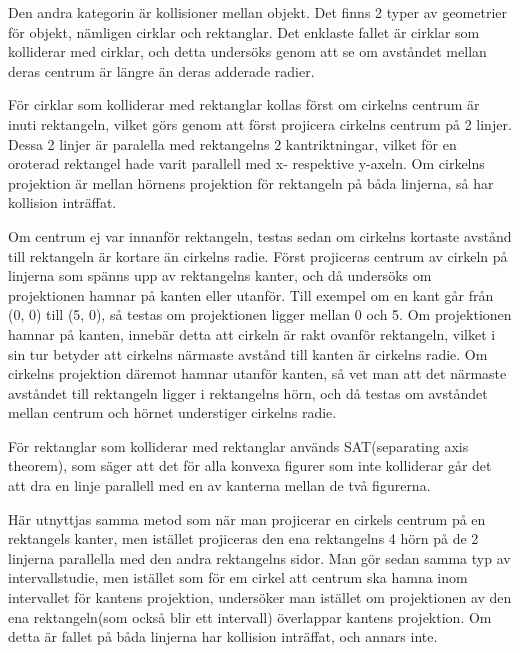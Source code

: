 \documentclass[12pt,a4paper]{article}
\begin{document}
Den andra kategorin är kollisioner mellan objekt. Det finns 2 typer av geometrier för objekt, nämligen cirklar och rektanglar. Det enklaste fallet är cirklar som kolliderar med cirklar, och detta undersöks genom att se om avståndet mellan deras centrum är längre än deras adderade radier.

\vspace{0.2cm}

För cirklar som kolliderar med rektanglar kollas först om cirkelns centrum är inuti rektangeln, vilket görs genom att först projicera cirkelns centrum på 2 linjer. Dessa 2 linjer är paralella med rektangelns 2 kantriktningar, vilket för en oroterad rektangel hade varit parallell med x- respektive y-axeln. Om cirkelns projektion är mellan hörnens projektion för rektangeln på båda linjerna, så har kollision inträffat.

\vspace{0.2cm}

Om centrum ej var innanför rektangeln, testas sedan om cirkelns kortaste avstånd till rektangeln är kortare än cirkelns radie. Först projiceras centrum av cirkeln på linjerna som spänns upp av rektangelns kanter, och då undersöks om projektionen hamnar på kanten eller utanför. Till exempel om en kant går från (0, 0) till (5, 0), så testas om projektionen ligger mellan 0 och 5. Om projektionen hamnar på kanten, innebär detta att cirkeln är rakt ovanför rektangeln, vilket i sin tur betyder att cirkelns närmaste avstånd till kanten är cirkelns radie. Om cirkelns projektion däremot hamnar utanför kanten, så vet man att det närmaste avståndet till rektangeln ligger i rektangelns hörn, och då testas om avståndet mellan centrum och hörnet understiger cirkelns radie.

\vspace{0.2cm}

För rektanglar som kolliderar med rektanglar används SAT(separating axis theorem), som säger att det för alla konvexa figurer som inte kolliderar går det att dra en linje parallell med en av kanterna mellan de två figurerna.

Här utnyttjas samma metod som när man projicerar en cirkels centrum på en rektangels kanter, men istället projiceras den ena rektangelns 4 hörn på de 2 linjerna parallella med den andra rektangelns sidor. Man gör sedan samma typ av intervallstudie, men istället som för em cirkel att centrum ska hamna inom intervallet för kantens projektion, undersöker man istället om projektionen av den ena rektangeln(som också blir ett intervall) överlappar kantens projektion. Om detta är fallet på båda linjerna har kollision inträffat, och annars inte.
\end{document}
